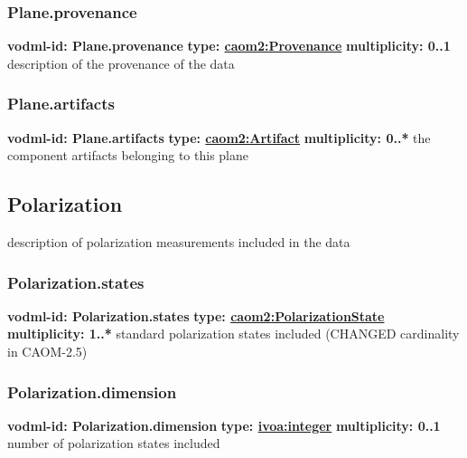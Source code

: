     \subsubsection{Plane.provenance}
      \textbf{vodml-id: Plane.provenance} \newline
      \textbf{type: \hyperref[sect:Provenance]{caom2:Provenance}} \newline
      \textbf{multiplicity: 0..1} \newline
      description of the provenance of the data

    \subsubsection{Plane.artifacts}
      \textbf{vodml-id: Plane.artifacts} \newline
      \textbf{type: \hyperref[sect:Artifact]{caom2:Artifact}} \newline
      \textbf{multiplicity: 0..*} \newline
      the component artifacts belonging to this plane

  \subsection{Polarization}
  \label{sect:Polarization}
    description of polarization measurements included in the data

    \subsubsection{Polarization.states}
      \textbf{vodml-id: Polarization.states} \newline
      \textbf{type: \hyperref[sect:PolarizationState]{caom2:PolarizationState}} \newline
      \textbf{multiplicity: 1..*} \newline
      standard polarization states included (CHANGED cardinality in CAOM-2.5)

    \subsubsection{Polarization.dimension}
      \textbf{vodml-id: Polarization.dimension} \newline
      \textbf{type: \hyperref[sect:ivoa]{ivoa:integer}} \newline
      \textbf{multiplicity: 0..1} \newline
      number of polarization states included

